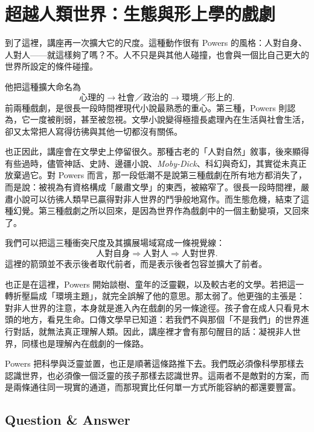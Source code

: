 \section{超越人類世界：生態與形上學的戲劇}

到了這裡，講座再一次擴大它的尺度。這種動作很有 Powers 的風格：人對自身、人對人——就這樣夠了嗎？不。人不只是與其他人碰撞，也會與一個比自己更大的世界所設定的條件碰撞。

他把這種擴大命名為
\begin{equation}
\text{心理的} \to \text{社會／政治的} \to \text{環境／形上的}.
\end{equation}
前兩種戲劇，是很長一段時間裡現代小說最熟悉的重心。第三種，Powers 則認為，它一度被削弱，甚至被忽視。文學小說變得極擅長處理內在生活與社會生活，卻又太常把人寫得彷彿與其他一切都沒有關係。

也正因此，講座會在文學史上停留很久。那種古老的「人對自然」敘事，後來顯得有些過時，儘管神話、史詩、邊疆小說、\emph{Moby-Dick}、科幻與奇幻，其實從未真正放棄過它。對 Powers 而言，那一段低潮不是說第三種戲劇在所有地方都消失了，而是說：被視為有資格構成「嚴肅文學」的東西，被縮窄了。很長一段時間裡，嚴肅小說可以彷彿人類早已贏得對非人世界的鬥爭般地寫作。而生態危機，結束了這種幻覺。第三種戲劇之所以回來，是因為世界作為戲劇中的一個主動變項，又回來了。

我們可以把這三種衝突尺度及其擴展場域寫成一條視覺線：
\begin{equation}
\text{人對自身} \Rightarrow \text{人對人} \Rightarrow \text{人對世界}.
\end{equation}
這裡的箭頭並不表示後者取代前者，而是表示後者包容並擴大了前者。

也正是在這裡，Powers 開始談樹、童年的泛靈觀，以及較古老的文學。若把這一轉折壓扁成「環境主題」，就完全誤解了他的意思。那太弱了。他更強的主張是：對非人世界的注意，本身就是進入內在戲劇的另一條途徑。孩子會在成人只看見木頭的地方，看見生命。口傳文學早已知道：若我們不與那個「不是我們」的世界進行對話，就無法真正理解人類。因此，講座裡才會有那句醒目的話：凝視非人世界，同樣也是理解內在戲劇的一條路。

Powers 把科學與泛靈並置，也正是順著這條路推下去。我們既必須像科學那樣去認識世界，也必須像一個泛靈的孩子那樣去認識世界。這兩者不是敵對的方案，而是兩條通往同一現實的通道，而那現實比任何單一方式所能容納的都還要豐富。

\subsection{Question \& Answer}

